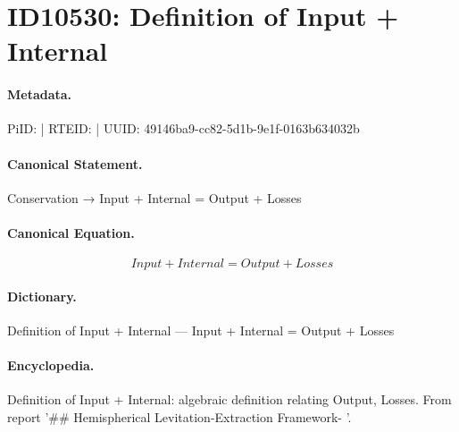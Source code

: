 \section*{ID10530: Definition of Input + Internal}
\paragraph{Metadata.}
PiID:  | RTEID:  | UUID: 49146ba9-cc82-5d1b-9e1f-0163b634032b

\paragraph{Canonical Statement.}
Conservation → Input + Internal = Output + Losses

\paragraph{Canonical Equation.}
\[
Input + Internal = Output + Losses
\]

\paragraph{Dictionary.}
Definition of Input + Internal — Input + Internal = Output + Losses

\paragraph{Encyclopedia.}
Definition of Input + Internal: algebraic definition relating Output, Losses. From report '\#\# Hemispherical Levitation-Extraction Framework- '.
